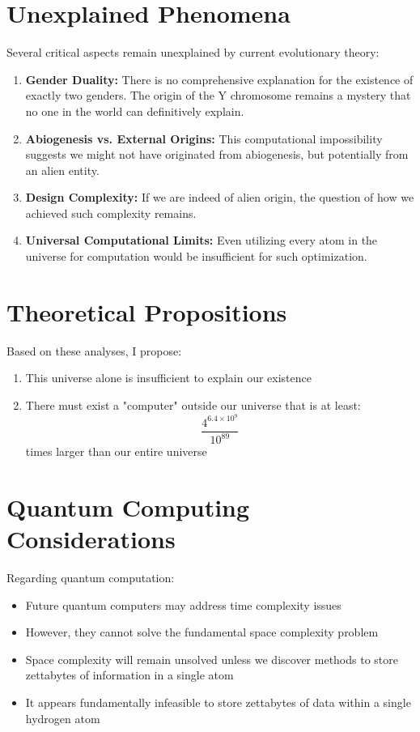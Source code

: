 \documentclass[11pt,a4paper]{article}
\begin{document}
\section{Unexplained Phenomena}
Several critical aspects remain unexplained by current evolutionary theory:

\begin{enumerate}
    \item \textbf{Gender Duality:} There is no comprehensive explanation for the existence of exactly two genders. The origin of the Y chromosome remains a mystery that no one in the world can definitively explain.
    
    \item \textbf{Abiogenesis vs. External Origins:} This computational impossibility suggests we might not have originated from abiogenesis, but potentially from an alien entity.
    
    \item \textbf{Design Complexity:} If we are indeed of alien origin, the question of how we achieved such complexity remains.
    
    \item \textbf{Universal Computational Limits:} Even utilizing every atom in the universe for computation would be insufficient for such optimization.
\end{enumerate}

\section{Theoretical Propositions}
Based on these analyses, I propose:

\begin{enumerate}
    \item This universe alone is insufficient to explain our existence
    
    \item There must exist a "computer" outside our universe that is at least:
    $$ \frac{4^{6.4 \times 10^9}}{10^{89}} $$
    times larger than our entire universe
\end{enumerate}

\section{Quantum Computing Considerations}
Regarding quantum computation:

\begin{itemize}
    \item Future quantum computers may address time complexity issues
    \item However, they cannot solve the fundamental space complexity problem
    \item Space complexity will remain unsolved unless we discover methods to store zettabytes of information in a single atom
    \item It appears fundamentally infeasible to store zettabytes of data within a single hydrogen atom
\end{itemize}
\end{document}
